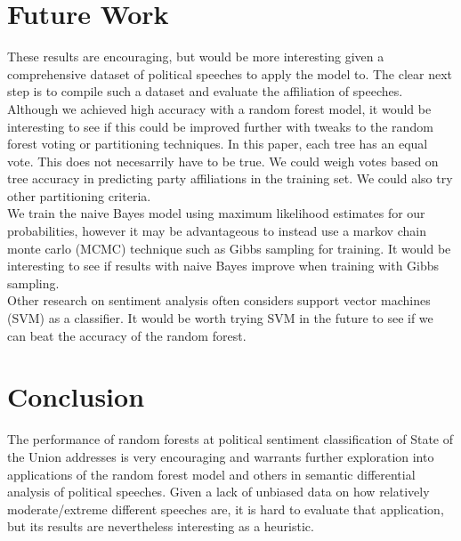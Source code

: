 \documentclass{amsart}
\theoremstyle{definition}
\theoremstyle{remark}
\numberwithin{equation}{section}
\begin{document}
\section{Future Work}
These results are encouraging, but would be more interesting given a comprehensive dataset of political speeches to apply the model to. The clear next step is to compile such a dataset and evaluate the affiliation of speeches.\\
Although we achieved high accuracy with a random forest model, it would be interesting to see if this could be improved further with tweaks to the random forest voting or partitioning techniques. In this paper, each tree has an equal vote. This does not necesarrily have to be true. We could weigh votes based on tree accuracy in predicting party affiliations in the training set. We could also try other partitioning criteria.\\
We train the naive Bayes model using maximum likelihood estimates for our probabilities, however it may be advantageous to instead use a markov chain monte carlo (MCMC) technique such as Gibbs sampling for training. It would be interesting to see if results with naive Bayes improve when training with Gibbs sampling.\\
Other research on sentiment analysis often considers support vector machines (SVM) as a classifier. It would be worth trying SVM in the future to see if we can beat the accuracy of the random forest.\\

\section{Conclusion}
The performance of random forests at political sentiment classification of State of the Union addresses is very encouraging and warrants further exploration into applications of the random forest model and others in semantic differential analysis of political speeches. Given a lack of unbiased data on how relatively moderate/extreme different speeches are, it is hard to evaluate that application, but its results are nevertheless interesting as a heuristic.\\

\newpage
\end{document}
